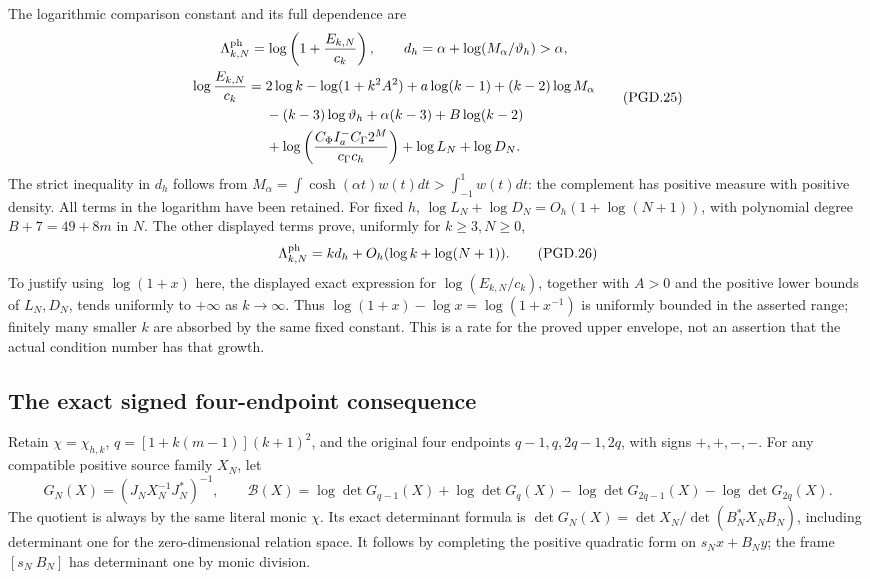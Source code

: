 The logarithmic comparison constant and its full dependence are
\[
 \begin{gathered}
 \Lambda_{k,N}^{\rm ph}
     =\log\left(1+\frac{E_{k,N}}{c_k}\right),\qquad
 d_h=\alpha+\log(M_\alpha/\vartheta_h)>\alpha,\\
 \begin{aligned}
 \log\frac{E_{k,N}}{c_k}
 ={}&2\log k-\log(1+k^2A^2)+a\log(k-1)
       +(k-2)\log M_\alpha\\
    &-(k-3)\log\vartheta_h+\alpha(k-3)+B\log(k-2)\\
    &+\log\left(\frac{C_\Phi I_a^-C_\Gamma2^M}
                         {c_\Gamma c_h}\right)
       +\log L_N+\log D_N .
 \end{aligned}
 \end{gathered}
 \tag{PGD.25}\label{eq:pgd-log-cost}
\]
The strict inequality in \(d_h\) follows from
\(M_\alpha=\int\cosh(\alpha t)w(t)dt>\int_{-1}^1w(t)dt\):
the complement has positive measure with positive density. All terms
in the logarithm have been retained. For fixed \(h\),
\(\log L_N+\log D_N=O_h(1+\log(N+1))\), with polynomial
degree \(B+7=49+8m\) in \(N\). The other displayed terms prove,
uniformly for \(k\geq3,N\geq0\),
\[
 \Lambda_{k,N}^{\rm ph}
       =k d_h+O_h(\log k+\log(N+1)).
 \tag{PGD.26}\label{eq:pgd-cost-rate}
\]
To justify using \(\log(1+x)\) here, the displayed exact expression
for \(\log(E_{k,N}/c_k)\), together with \(A>0\) and the positive
lower bounds of \(L_N,D_N\), tends uniformly to \(+\infty\) as
\(k\to\infty\). Thus
\(\log(1+x)-\log x=\log(1+x^{-1})\) is uniformly bounded in
the asserted range; finitely many smaller \(k\) are absorbed by
the same fixed constant. This is a rate for the proved upper envelope,
not an assertion that the actual condition number has that growth.

\subsection{The exact signed four-endpoint consequence}

Retain \(\chi=\chi_{h,k}\),
\(q=[1+k(m-1)](k+1)^2\), and the original four endpoints
\(q-1,q,2q-1,2q\), with signs \(+,+,-,-\).
For any compatible positive source family \(X_N\), let
\[
 G_N(X)=(J_NX_N^{-1}J_N^*)^{-1},\qquad
 \mathcal B(X)=\log\det G_{q-1}(X)+\log\det G_q(X)
       -\log\det G_{2q-1}(X)-\log\det G_{2q}(X).
 \tag{PGD.27}\label{eq:pgd-four-functional}
\]
The quotient is always by the same literal monic \(\chi\).
Its exact determinant formula is
\(\det G_N(X)=\det X_N/\det(B_N^*X_NB_N)\), including determinant
one for the zero-dimensional relation space. It follows by completing
the positive quadratic form on \(s_Nx+B_Ny\); the frame
\([s_N\ B_N]\) has determinant one by monic division.

